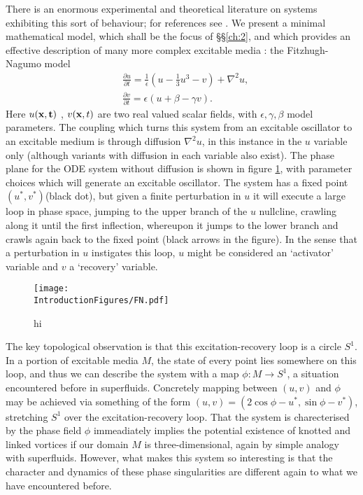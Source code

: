 There is an enormous experimental and theoretical literature on systems exhibiting this sort of behaviour; for references see \cite{}. We present a minimal mathematical model, which shall be the focus of \S\S\ref{ch:2}, and which provides an effective description of many more complex excitable media \cite{Winfree}: the Fitzhugh-Nagumo model \cite{Fitz}
\begin{eqnarray}
&\frac{\partial u}{\partial t}= \frac{1}{\epsilon}(u - \frac{1}{3} u^3 - v) + \nabla^2 u, \\
&\frac{\partial v}{\partial t} = {\epsilon}(u + \beta - \gamma v).
\end{eqnarray}
Here $u(\bf {x} ,t)$ , $v({\bf x},t)$ are two real valued scalar fields, with $\epsilon,\gamma,\beta$ model parameters. The coupling which turns this system from an excitable oscillator to an excitable medium is through diffusion $\nabla^2 u$, in this instance in the $u$ variable only (although variants with diffusion in each variable also exist). The phase plane for the ODE system without diffusion is shown in figure \ref{fig:FN}, with parameter choices which will generate an excitable oscillator. The system has a fixed  point $(u^*,v^*)$(black dot), but given a finite perturbation in $u$ it will execute a large loop in phase space, jumping to the upper branch of the $u$ nullcline, crawling along it until the first inflection, whereupon it jumps to the lower branch and crawls again back to the fixed point (black arrows in the figure). In the sense that a perturbation in $u$ instigates this loop, $u$ might be considered an `activator' variable and $v$ a `recovery' variable.
\begin{figure}[htbp]
\centering
\texttt{[image: \\IntroductionFigures/FN.pdf]}
\caption{hi }
\label{fig:FN}
\end{figure}

The key topological observation is that this excitation-recovery loop is a circle $S^1$. In a portion of excitable media $M$, the state of every point lies somewhere on this loop, and thus we can describe the system with a map $\phi : M \rightarrow S^1$, a situation encountered before in superfluids. Concretely mapping between $(u,v)$ and $\phi$ may be achieved via something of the form $(u,v) = (2 \cos \phi - u^*, \sin \phi - v^*)$, stretching $S^1$ over the excitation-recovery loop. That the system is charecterised by the phase field $\phi$ immeadiately implies the potential existence of knotted and linked vortices if our domain $M$ is three-dimensional, again by simple analogy with superfluids. However, what makes this system so interesting is that the character and dynamics of these phase singularities are different again to what we have encountered before. 

